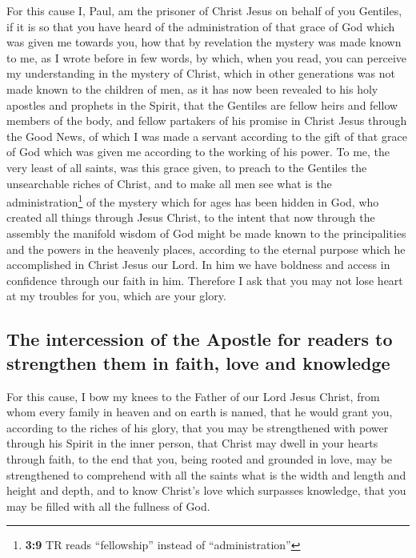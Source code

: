  For this cause I, Paul, am the prisoner of Christ Jesus
on behalf of you Gentiles,  if it is so that you have
heard of the administration of that grace of God which was given me
towards you,  how that by revelation the mystery was made
known to me, as I wrote before in few words,  by which,
when you read, you can perceive my understanding in the mystery of
Christ,  which in other generations was not made known to
the children of men, as it has now been revealed to his holy apostles
and prophets in the Spirit,  that the Gentiles are fellow
heirs and fellow members of the body, and fellow partakers of his
promise in Christ Jesus through the Good News,  of which I
was made a servant according to the gift of that grace of God which was
given me according to the working of his power.  To me,
the very least of all saints, was this grace given, to preach to the
Gentiles the unsearchable riches of Christ,  and to make
all men see what is the administration\footnote{\textbf{3:9} TR reads
  ``fellowship'' instead of ``administration''} of the mystery which for
ages has been hidden in God, who created all things through Jesus
Christ,  to the intent that now through the assembly the
manifold wisdom of God might be made known to the principalities and the
powers in the heavenly places,  according to the eternal
purpose which he accomplished in Christ Jesus our Lord. 
In him we have boldness and access in confidence through our faith in
him.  Therefore I ask that you may not lose heart at my
troubles for you, which are your glory.

\hypertarget{the-intercession-of-the-apostle-for-readers-to-strengthen-them-in-faith-love-and-knowledge}{%
\subsection{The intercession of the Apostle for readers to strengthen
them in faith, love and
knowledge}\label{the-intercession-of-the-apostle-for-readers-to-strengthen-them-in-faith-love-and-knowledge}}

 For this cause, I bow my knees to the Father of our Lord
Jesus Christ,  from whom every family in heaven and on
earth is named,  that he would grant you, according to
the riches of his glory, that you may be strengthened with power through
his Spirit in the inner person,  that Christ may dwell in
your hearts through faith, to the end that you, being rooted and
grounded in love,  may be strengthened to comprehend with
all the saints what is the width and length and height and depth,
 and to know Christ's love which surpasses knowledge,
that you may be filled with all the fullness of God.

